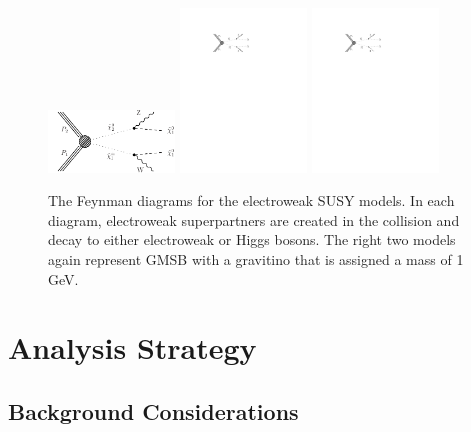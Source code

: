  \begin{figure}
    \begin{center}
      \includegraphics[width=0.3\textwidth]{figures/diagrams/TChiWZ.pdf} 
      \includegraphics[width=0.3\textwidth]{figures/diagrams/TChiZZ.pdf} 
      \includegraphics[width=0.3\textwidth]{figures/diagrams/TChiHZ.pdf} 
    \end{center}
    \caption{
      \label{fig:feynman_ewk} The Feynman diagrams for the electroweak SUSY models. In each diagram, electroweak superpartners are created in the collision and decay to either electroweak or Higgs bosons. The right two models again represent GMSB with a gravitino that is assigned a mass of 1 GeV.
    }
  \end{figure}

  \clearpage

\section{Analysis Strategy}

  \subsection{Background Considerations} \label{sec:background_considerations}

